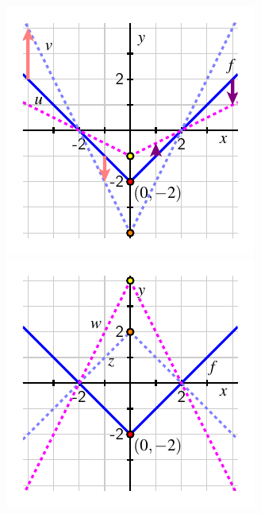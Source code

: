 \documentclass{ximera}
\begin{document}
\begin{example}
\begin{image}
\includegraphics[width=1\linewidth]{images/transformations-vert-stretch-1}
\includegraphics[width=1\linewidth]{images/transformations-vert-stretch-2}
\end{image}



\end{example}
\end{document}
